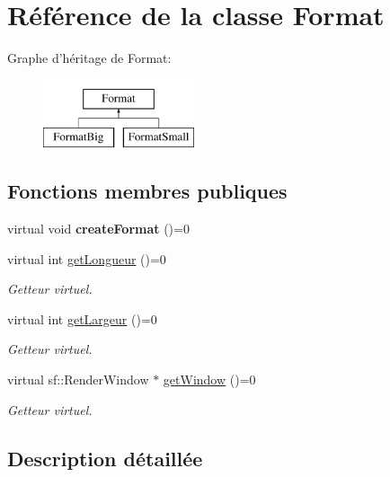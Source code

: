\hypertarget{classFormat}{\section{Référence de la classe Format}
\label{classFormat}
}
Graphe d'héritage de Format\+:\begin{figure}[H]
\begin{center}
\leavevmode
\includegraphics[height=2.000000cm]{classFormat}
\end{center}
\end{figure}
\subsection*{Fonctions membres publiques}
\begin{DoxyCompactItemize}
\item 
\hypertarget{classFormat_a07f4f6f3b4c5182a63d684c4a20b9d96}{virtual void {\bfseries create\+Format} ()=0}\label{classFormat_a07f4f6f3b4c5182a63d684c4a20b9d96}

\item 
virtual int \hyperlink{classFormat_ad5474275e85a8a47b5f0da28d7020283}{get\+Longueur} ()=0
\begin{DoxyCompactList}\small\item\em Getteur virtuel. \end{DoxyCompactList}\item 
virtual int \hyperlink{classFormat_a96150ade441ed68e056c20db86fd1607}{get\+Largeur} ()=0
\begin{DoxyCompactList}\small\item\em Getteur virtuel. \end{DoxyCompactList}\item 
virtual sf\+::\+Render\+Window $\ast$ \hyperlink{classFormat_a71418db76d6925708d403a1cd31b74f0}{get\+Window} ()=0
\begin{DoxyCompactList}\small\item\em Getteur virtuel. \end{DoxyCompactList}\end{DoxyCompactItemize}


\subsection{Description détaillée}


